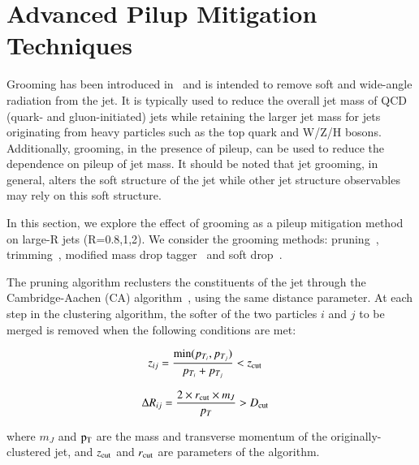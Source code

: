 \newcommand{\pt}{ p_{T}}


\chapter{Advanced Pilup Mitigation Techniques  \label{ Advanced Pilup Mitigation Techniques}}




Grooming has been introduced in~\cite{Butterworth:2008tr} and is intended to remove soft and wide-angle radiation from the jet.  
It is typically used to reduce the overall jet mass of QCD (quark- and gluon-initiated) jets while retaining the larger jet mass for jets originating from heavy particles
such as the top quark and W/Z/H bosons.
Additionally, grooming, in the presence of pileup, can be used to reduce the dependence on pileup of jet mass.  
It should be noted that jet grooming, in general, alters the soft structure of the jet while other jet structure observables may rely on this soft structure.  

In this section, we explore the effect of grooming as a pileup mitigation method on large-R jets (R=0.8,1,2).
We consider the grooming methods: pruning~\cite{Ellis:2009me}, trimming~\cite{Krohn:2009th}, modified mass drop tagger~\cite{Dasgupta:2013ihk} and soft drop~\cite{Larkoski:2014wba}.

The pruning algorithm reclusters the constituents of the jet through the Cambridge-Aachen (CA) algorithm~\cite{Dokshitzer:1997in}, using the same distance parameter.  
At each step in the clustering algorithm, the softer of the two particles $i$ and $j$ to be merged is removed when the following conditions are met:

\begin{align}
z_{ij} & = \frac{ {\rm min}(p_{T_{i}}, p_{T_{j}})} {p_{T_{i}} + p_{T_{j}}} < z_{\rm cut} 
\label{eq:Rij1}
\end{align}

\begin{align}
\Delta R_{ij} & = \frac{2 \times r_{\rm cut} \times m_J}{p_{T}} > D_{\rm cut}
\label{eq:Rij2}
\end{align}

where $m_J$ and $\rm p_{T}$ are the mass and transverse momentum of the originally-clustered jet, and $z_{\rm cut}$ and $r_{\rm cut}$ are parameters of the algorithm.




